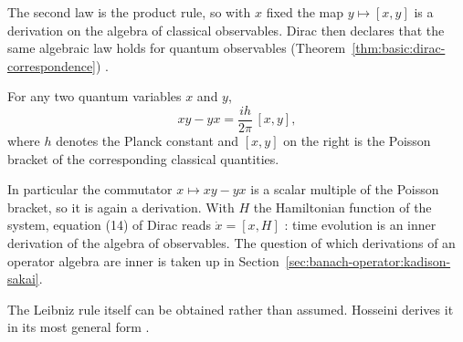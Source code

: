 The second law is the product rule, so with $x$ fixed the map
$y\mapsto[x,y]$ is a derivation on the algebra of classical observables.
Dirac then declares that the same algebraic law holds for quantum
observables (Theorem~\ref{thm:basic:dirac-correspondence}) \cite[p.~648]{Dirac1925}.

\begin{theorem}\label{thm:basic:dirac-correspondence}
For any two quantum variables $x$ and $y$,
\[
xy-yx = \frac{ih}{2\pi}\,[x,y],
\]
where $h$ denotes the Planck constant and $[x,y]$ on the right is the Poisson
bracket of the corresponding classical quantities.
\end{theorem}

In particular the commutator $x\mapsto xy-yx$ is a scalar multiple of the
Poisson bracket, so it is again a derivation. With $H$ the Hamiltonian
function of the system, equation (14) of Dirac reads $\dot x=[x,H]$
\cite[equation (14), p.~651]{Dirac1925}: time evolution is an inner
derivation of the algebra of observables. The question of which derivations
of an operator algebra are inner is taken up in
Section~\ref{sec:banach-operator:kadison-sakai}. %


The Leibniz rule itself can be obtained rather than assumed. Hosseini derives
it in its most general form \cite[Abstract, p.~1]{Hosseini2022LeibnizRule}.
